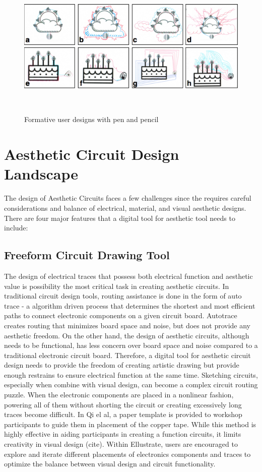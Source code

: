 \documentclass{sigchi}
\begin{document}
\begin{figure}
\centering
  \includegraphics[width=1\columnwidth]{figures/Ellustrate_figures_formative_user_design}
  \caption{Formative user designs with pen and pencil}~\label{fig:formative_user_design}
\end{figure}

\section{Aesthetic Circuit Design Landscape}
The design of Aesthetic Circuits faces a few challenges since the requires careful considerations and balance of electrical, material, and visual aesthetic designs. There are four major features that a digital tool for aesthetic tool needs to include: 
\subsection{Freeform Circuit Drawing Tool}
The design of electrical traces that possess both electrical function and aesthetic value is possibility the most critical task in creating aesthetic circuits. In traditional circuit design tools, routing assistance is done in the form of auto trace - a algorithm driven process that determines the shortest and most efficient paths to connect electronic components on a given circuit board. Autotrace creates routing that minimizes board space and noise, but does not provide any aesthetic freedom. On the other hand, the design of aesthetic circuits, although needs to be functional, has less concern over board space and noise compared to a traditional electronic circuit board. Therefore, a digital tool for aesthetic circuit design needs to provide the freedom of creating artistic drawing but provide enough restrains to ensure electrical function at the same time.  Sketching circuits, especially when combine with visual design, can become a complex circuit routing puzzle. When the electronic components are placed in a nonlinear fashion, powering all of them without shorting the circuit or creating excessively long traces become difficult. In Qi el al, a paper template is provided to workshop participants to guide them in placement of the copper tape. While this method is highly effective in aiding participants in creating a function circuits, it limits creativity in visual design (cite).  Within Ellustrate, users are encouraged to explore and iterate different placements of electronics components and traces to optimize the balance between visual design and circuit functionality.
\end{document}

